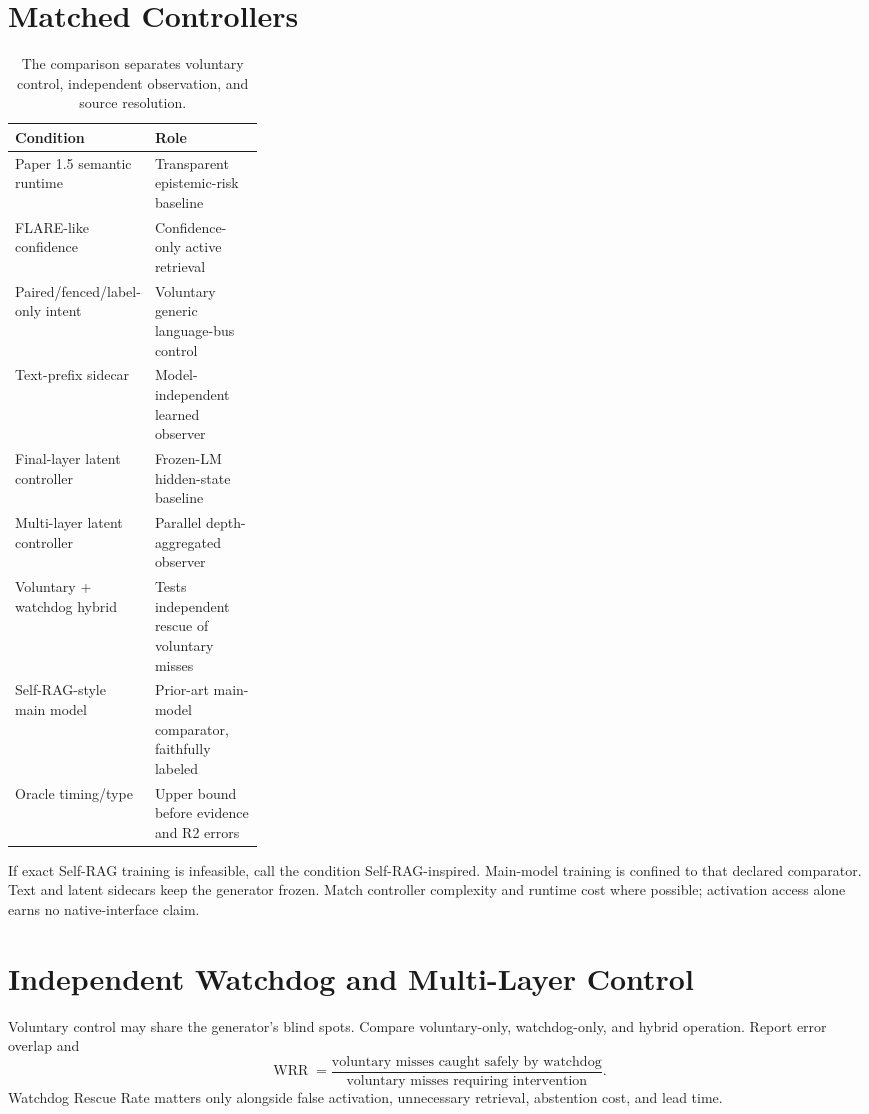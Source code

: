 \documentclass[10pt]{article}
\begin{document}
\section{Matched Controllers}
\begin{table}[t]
\centering\small
\caption{The comparison separates voluntary control, independent observation,
and source resolution.}
\begin{tabularx}{\linewidth}{@{}p{0.29\linewidth}Y@{}}
\toprule
Condition & Role \\
\midrule
Paper 1.5 semantic runtime & Transparent epistemic-risk baseline \\
FLARE-like confidence & Confidence-only active retrieval \\
Paired/fenced/label-only intent & Voluntary generic language-bus control \\
Text-prefix sidecar & Model-independent learned observer \\
Final-layer latent controller & Frozen-LM hidden-state baseline \\
Multi-layer latent controller & Parallel depth-aggregated observer \\
Voluntary + watchdog hybrid & Tests independent rescue of voluntary misses \\
Self-RAG-style main model & Prior-art main-model comparator, faithfully labeled \\
Oracle timing/type & Upper bound before evidence and R2 errors \\
\bottomrule
\end{tabularx}
\end{table}

If exact Self-RAG training is infeasible, call the condition Self-RAG-inspired.
Main-model training is confined to that declared comparator. Text and latent
sidecars keep the generator frozen. Match controller complexity and runtime cost
where possible; activation access alone earns no native-interface claim.

\section{Independent Watchdog and Multi-Layer Control}
Voluntary control may share the generator's blind spots. Compare voluntary-only,
watchdog-only, and hybrid operation. Report error overlap and
\[
\operatorname{WRR}=\frac{\text{voluntary misses caught safely by watchdog}}
{\text{voluntary misses requiring intervention}}.
\]
Watchdog Rescue Rate matters only alongside false activation, unnecessary
retrieval, abstention cost, and lead time.
\end{document}
